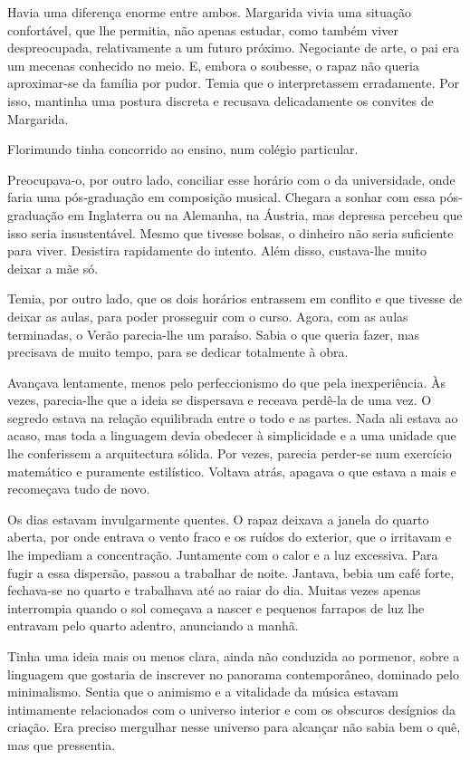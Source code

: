 Havia uma diferença enorme entre ambos. Margarida vivia uma situação
confortável, que lhe permitia, não apenas estudar, como também viver
despreocupada, relativamente a um futuro próximo. Negociante de arte, o
pai era um mecenas conhecido no meio. E, embora o soubesse, o rapaz não
queria aproximar-se da família por pudor. Temia que o interpretassem
erradamente. Por isso, mantinha uma postura discreta e recusava
delicadamente os convites de Margarida.

Florimundo tinha concorrido ao ensino, num colégio particular.

Preocupava-o, por outro lado, conciliar esse horário com o da
universidade, onde faria uma pós-graduação em composição musical.
Chegara a sonhar com essa pós-graduação em Inglaterra ou na Alemanha, na
Áustria, mas depressa percebeu que isso seria insustentável. Mesmo que
tivesse bolsas, o dinheiro não seria suficiente para viver. Desistira
rapidamente do intento. Além disso, custava-lhe muito deixar a mãe só.

Temia, por outro lado, que os dois horários entrassem em conflito e que
tivesse de deixar as aulas, para poder prosseguir com o curso. Agora,
com as aulas terminadas, o Verão parecia-lhe um paraíso. Sabia o que
queria fazer, mas precisava de muito tempo, para se dedicar totalmente à
obra.

Avançava lentamente, menos pelo perfeccionismo do que pela
inexperiência. Às vezes, parecia-lhe que a ideia se dispersava e receava
perdê-la de uma vez. O segredo estava na relação equilibrada entre o
todo e as partes. Nada ali estava ao acaso, mas toda a linguagem devia
obedecer à simplicidade e a uma unidade que lhe conferissem a
arquitectura sólida. Por vezes, parecia perder-se num exercício
matemático e puramente estilístico. Voltava atrás, apagava o que estava
a mais e recomeçava tudo de novo.

Os dias estavam invulgarmente quentes. O rapaz deixava a janela do
quarto aberta, por onde entrava o vento fraco e os ruídos do exterior,
que o irritavam e lhe impediam a concentração. Juntamente com o calor e
a luz excessiva. Para fugir a essa dispersão, passou a trabalhar de
noite. Jantava, bebia um café forte, fechava-se no quarto e trabalhava
até ao raiar do dia. Muitas vezes apenas interrompia quando o sol
começava a nascer e pequenos farrapos de luz lhe entravam pelo quarto
adentro, anunciando a manhã.

Tinha uma ideia mais ou menos clara, ainda não conduzida ao pormenor,
sobre a linguagem que gostaria de inscrever no panorama contemporâneo,
dominado pelo minimalismo. Sentia que o animismo e a vitalidade da
música estavam intimamente relacionados com o universo interior e com os
obscuros desígnios da criação. Era preciso mergulhar nesse universo para
alcançar não sabia bem o quê, mas que pressentia.

